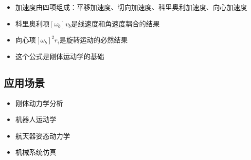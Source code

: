 \documentclass[12pt,a4paper]{article}
\begin{document}
\begin{itemize}
\item 加速度由四项组成：平移加速度、切向加速度、科里奥利加速度、向心加速度
\item 科里奥利项$[\omega_b] v_b$是线速度和角速度耦合的结果
\item 向心项$[\omega_b]^2 r_i$是旋转运动的必然结果
\item 这个公式是刚体运动学的基础
\end{itemize}

\subsection{应用场景}

\begin{itemize}
\item 刚体动力学分析
\item 机器人运动学
\item 航天器姿态动力学
\item 机械系统仿真
\end{itemize}
\end{document}
